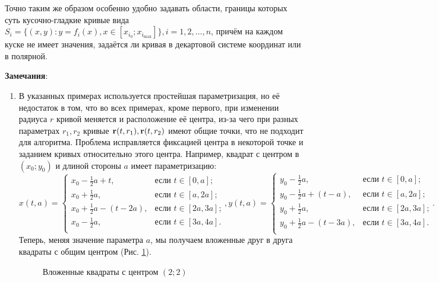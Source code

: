 \documentclass[a4paper, 12pt]{article}
\begin{document}
Точно таким же образом особенно удобно задавать области, границы которых суть кусочно-гладкие кривые вида $S_i=\{(x,y): y=f_i(x), x \in [x_{i_0};x_{i_{\max}}]\}, i=1,2,\dots, n$, причём на каждом куске не имеет значения, задаётся ли кривая в декартовой системе координат или в полярной.

{\bf Замечания}: 

\begin{enumerate}
  \item В указанных примерах используется простейшая параметризация, но её недостаток в том, что во всех примерах, кроме первого, при изменении радиуса $r$ кривой меняется и расположение её центра, из-за чего при разных параметрах $r_1,r_2$ кривые ${\bf r}(t,r_1),{\bf r}(t,r_2)$ имеют общие точки, что не подходит для алгоритма.
Проблема исправляется фиксацией центра в некоторой точке и заданием кривых относительно этого центра. Например, квадрат с центром в $(x_0;y_0)$ и длиной стороны $a$ имеет параметризацию:
\[
x(t,a) =
\begin{cases}
x_0-\frac{1}{2}a+t, & \text{если $t \in [0,a]$;} \\
x_0+\frac{1}{2}a, & \text{если $t \in [a,2a]$;} \\
x_0+\frac{1}{2}a-(t-2a), & \text{если $t \in [2a,3a]$;} \\
x_0-\frac{1}{2}a, & \text{если $t \in [3a,4a]$.} \\
\end{cases},
y(t,a) =
\begin{cases}
y_0-\frac{1}{2}a, & \text{если $t \in [0,a]$;} \\
y_0-\frac{1}{2}a+(t-a), & \text{если $t \in [a,2a]$;} \\
y_0+\frac{1}{2}a, & \text{если $t \in [2a,3a]$;} \\
y_0+\frac{1}{2}a-(t-3a), & \text{если $t \in [3a,4a]$.} \\
\end{cases}.
\]
Теперь, меняя значение параметра $a$, мы получаем вложенные друг в друга квадраты с общим центром (Рис. \ref{rects}).
\begin{figure}[h!]
  \noindent{}
  \caption{Вложенные квадраты с центром $(2;2)$}
  \label{rects}
  \end{figure}
  

\end{enumerate}
\end{document}
